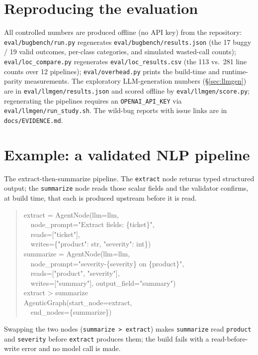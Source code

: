 \documentclass[11pt]{article}
\newcommand{\code}[1]{\texttt{#1}}
\begin{document}


\appendix

\section{Reproducing the evaluation}
\label{app:repro}

All controlled numbers are produced offline (no API key) from the repository:
\code{eval/bugbench/run.py} regenerates \code{eval/bugbench/results.json} (the 17
buggy / 19 valid outcomes, per-class categories, and simulated wasted-call
counts); \code{eval/loc\_compare.py} regenerates \code{eval/loc\_results.csv} (the
113 vs.\ 281 line counts over 12 pipelines); \code{eval/overhead.py} prints the
build-time and runtime-parity measurements. The exploratory LLM-generation
numbers (\S\ref{sec:llmgen}) are in \code{eval/llmgen/results.json} and scored
offline by \code{eval/llmgen/score.py}; regenerating the pipelines requires an
\code{OPENAI\_API\_KEY} via \code{eval/llmgen/run\_study.sh}. The wild-bug reports
with issue links are in \code{docs/EVIDENCE.md}.

\section{Example: a validated NLP pipeline}
\label{app:example}

The extract-then-summarize pipeline. The \code{extract} node returns typed
structured output; the \code{summarize} node reads those scalar fields and the
validator confirms, at build time, that each is produced upstream before it is
read.

\begin{quote}\small\ttfamily
extract = AgentNode(llm=llm,\\
\ \ node\_prompt="Extract fields: \{ticket\}",\\
\ \ reads=["ticket"],\\
\ \ writes=\{"product": str, "severity": int\})\\
summarize = AgentNode(llm=llm,\\
\ \ node\_prompt="severity-\{severity\} on \{product\}",\\
\ \ reads=["product", "severity"],\\
\ \ writes=["summary"], output\_field="summary")\\
extract > summarize\\
AgenticGraph(start\_node=extract,\\
\ \ end\_nodes=\{summarize\})
\end{quote}

Swapping the two nodes (\code{summarize > extract}) makes \code{summarize} read
\code{product} and \code{severity} before \code{extract} produces them; the build
fails with a read-before-write error and no model call is made.
\end{document}
